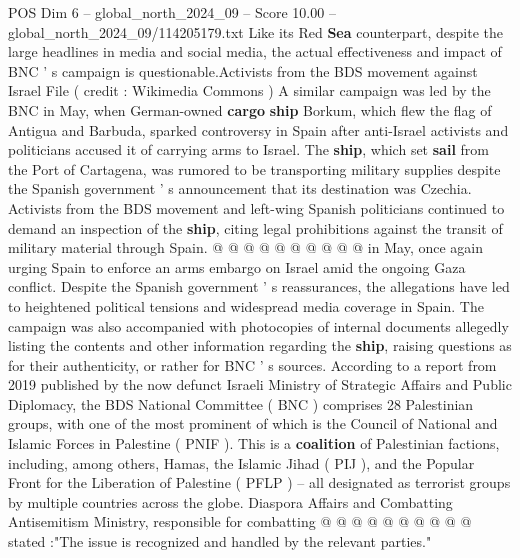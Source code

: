\begin{textsample}{POS Dim 6 – global\_north\_2024\_09 – Score 10.00 – global\_north\_2024\_09/114205179.txt}
Like its Red \textbf{Sea} counterpart, despite the large headlines in media and social media, the actual effectiveness and impact of BNC ' s campaign is questionable.Activists from the BDS movement against Israel File ( credit : Wikimedia Commons ) A similar campaign was led by the BNC in May, when German-owned \textbf{cargo} \textbf{ship} Borkum, which flew the flag of Antigua and Barbuda, sparked controversy in Spain after anti-Israel activists and politicians accused it of carrying arms to Israel.
The \textbf{ship}, which set \textbf{sail} from the Port of Cartagena, was rumored to be transporting military supplies despite the Spanish government ' s announcement that its destination was Czechia.
Activists from the BDS movement and left-wing Spanish politicians continued to demand an inspection of the \textbf{ship}, citing legal prohibitions against the transit of military material through Spain. @ @ @ @ @ @ @ @ @ @ in May, once again urging Spain to enforce an arms embargo on Israel amid the ongoing Gaza conflict.
Despite the Spanish government ' s reassurances, the allegations have led to heightened political tensions and widespread media coverage in Spain.
The campaign was also accompanied with photocopies of internal documents allegedly listing the contents and other information regarding the \textbf{ship}, raising questions as for their authenticity, or rather for BNC ' s sources.
According to a report from 2019 published by the now defunct Israeli Ministry of Strategic Affairs and Public Diplomacy, the BDS National Committee ( BNC ) comprises 28 Palestinian groups, with one of the most prominent of which is the Council of National and Islamic Forces in Palestine ( PNIF ).
This is a \textbf{coalition} of Palestinian factions, including, among others, Hamas, the Islamic Jihad ( PIJ ), and the Popular Front for the Liberation of Palestine ( PFLP ) -- all designated as terrorist groups by multiple countries across the globe.
Diaspora Affairs and Combatting Antisemitism Ministry, responsible for combatting @ @ @ @ @ @ @ @ @ @ stated :"The issue is recognized and handled by the relevant parties."

\end{textsample}
